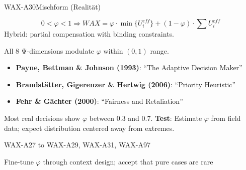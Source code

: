 \begin{axiomspec}{WAX-A30}{Mischform (Realität)}

\begin{equation}
0 < \varphi < 1 \Rightarrow WAX = \varphi \cdot \min\{U_i^{eff}\} + (1-\varphi) \cdot \sum U_i^{eff}
\end{equation}
Hybrid: partial compensation with binding constraints.

All 8 Ψ-dimensions modulate $\varphi$ within $(0,1)$ range.

\begin{itemize}
\item \textbf{Payne, Bettman \& Johnson (1993)}: ``The Adaptive Decision Maker''
\item \textbf{Brandstätter, Gigerenzer \& Hertwig (2006)}: ``Priority Heuristic''
\item \textbf{Fehr \& Gächter (2000)}: ``Fairness and Retaliation''
\end{itemize}

Most real decisions show $\varphi$ between 0.3 and 0.7.
\textbf{Test}: Estimate $\varphi$ from field data; expect distribution centered away from extremes.

WAX-A27 to WAX-A29, WAX-A31, WAX-A97

Fine-tune $\varphi$ through context design; accept that pure cases are rare

\end{axiomspec}


